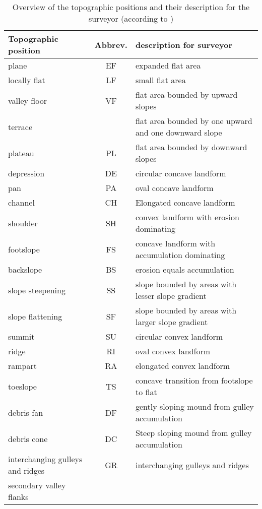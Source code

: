 \documentclass[preprint,12pt,authoryear]{elsarticle}
\begin{document}
\begin{table}[!htbp]
\caption{Overview of the topographic positions and their description for the surveyor (according to \cite{Englisch1998})}
\begin{center}    \begin{tabular}{  p{4cm} c p{9cm} }
	\hline\hline
	Topographic position & Abbrev. & description for surveyor \\ \hline
	plane &EF& expanded flat area  \\ 
	locally flat &LF&	small flat area  \\
	valley floor &VF& flat area bounded by upward slopes  \\
	\raisebox{-0ex} {terrace} &\raisebox{-0ex}{TE} & flat area bounded by one upward and one downward slope  \\ 
	plateau &PL& flat area bounded by downward slopes  \\ 
	depression &DE& circular concave landform  \\ 
	pan &PA& oval concave landform  \\ 
	channel &CH& Elongated concave landform  \\ 
	shoulder &SH& convex landform with erosion dominating  \\ 
	footslope &FS& concave landform with accumulation dominating  \\ 
	backslope &BS& erosion equals accumulation  \\ 
	slope steepening &SS& slope bounded by areas with lesser slope gradient  \\ 
	slope flattening &SF& slope bounded by areas with larger slope gradient  \\ 
 	summit &SU& circular convex landform  \\ 
	ridge &RI& oval convex landform  \\ 
	rampart &RA& elongated convex landform  \\ 
	toeslope &TS& concave transition from footslope to flat  \\ 
	debris fan &DF& gently sloping mound from gulley accumulation  \\ 
	debris cone &DC& Steep sloping mound from gulley accumulation  \\ 
	interchanging gulleys and ridges &\raisebox{-1.5ex} {GR} & \raisebox {-1.5ex} {interchanging gulleys and ridges}  \\
	secondary valley flanks &\raisebox{-1.5ex}{SV}& \raisebox{-1.5ex}{secondary valley flanks}  \\ 
    \end{tabular}
\end{center}	
\label{table:topopositions}
\end{table}
\end{document}
